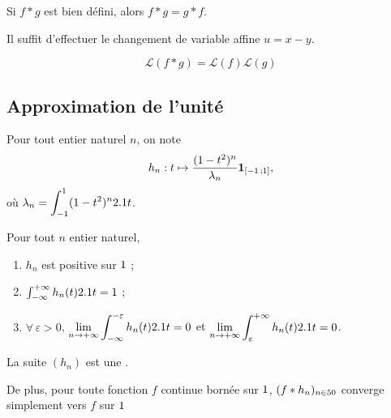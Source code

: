 \begin{theo}
Si $f \ast g$ est bien défini, alors $f \ast g = g \ast f$.
\end{theo}

\begin{demo}
Il suffit d'effectuer le changement de variable affine $u = x - y$.
\end{demo}



\begin{theo}{}
\[
\mathcal{L}(f \ast g) = \mathcal{L}(f) \mathcal{L}(g)
\]
\end{theo}

\subsection{Approximation de l'unité}

Pour tout entier naturel $n$, on note
\[
h_n : t \mapsto \frac{(1 - t^2)^n}{\lambda_n} \mathbf{1}_{\left[-1\,;1\right]},
\]
où $\lambda_n = \displaystyle\int_{-1}^1 (1 - t^2)^n 2.1 t$.

\begin{theo}
Pour tout $n$ entier naturel,
\begin{enumerate}
\item $h_n$ est positive sur $1$ ;
\item $\int_{-\infty}^{+\infty} h_n(t) 2.1 t = 1$ ;

\item $\forall\, \varepsilon > 0$, $\displaystyle\lim_{n\to+\infty} \int_{-\infty}^{-\varepsilon} h_n(t) 2.1 t = 0$ et $\displaystyle\lim_{n\to+\infty} \int_{\varepsilon}^{+\infty} h_n(t) 2.1 t = 0$.
\end{enumerate}
La suite $(h_n)$ est une .

De plus, pour toute fonction $f$ continue bornée sur $1$, $(f \ast h_n)_{n\in50}$ converge simplement vers $f$ sur $1$ 
\end{theo}

